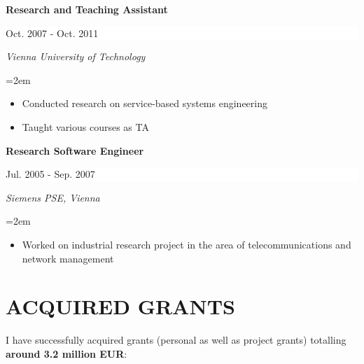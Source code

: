 \documentclass[paper=letter,fontsize=11pt]{scrartcl} %
\newcommand{\sepspace}{\vspace*{1em}}		%
\newcommand{\NewPart}[2]{\section*{\uppercase{#1} #2}}
\newcommand{\EducationEntry}[4]{
		\noindent \textbf{#1} \hfill      %
		\colorbox{White}{%
			\parbox{10em}{%
			\hfill\color{Black}#2}} \par  %
		\noindent \textit{#3} \par        %
		\noindent\hangindent=2em\hangafter=0 \small #4 %
		\normalsize \par}
\begin{document}
\sepspace
\EducationEntry{Research and Teaching Assistant}{Oct. 2007 - Oct. 2011}{Vienna
University of Technology} {\begin{itemize}\item{Conducted research on service-based systems engineering}
\item{Taught various courses as TA}
\end{itemize}}
\EducationEntry{Research Software Engineer}{Jul. 2005 - Sep. 2007}{Siemens PSE,
Vienna}{ {\begin{itemize}\item{Worked on industrial research project in the area of telecommunications and network management}
\end{itemize}}
}

\newpage

\NewPart{Acquired Grants}{}

I have successfully acquired grants (personal as well as project grants) totalling \textbf{around 3.2 million EUR}:
\end{document}
